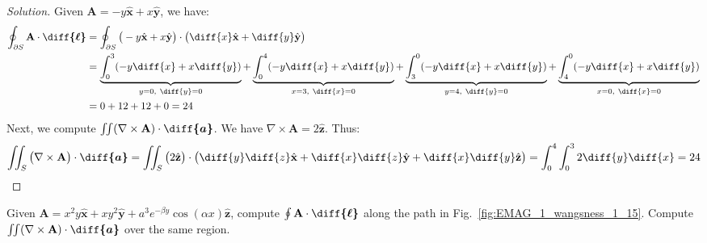 \documentclass[crop=false,class=book,oneside]{standalone}
\begin{document}
            \begin{proof}[Solution]
                Given
                $\mathbf{A}=-y\hat{\mathbf{x}}+x\hat{\mathbf{y}}$,
                we have:
                \begin{align*}
                    \oint_{\partial S}
                    \mathbf{A}\cdot\boldsymbol{\diff{\ell}}
                    &=\oint_{\partial{S}}\big(-y\hat{\mathbf{x}}
                    +x\hat{\mathbf{y}}\big)
                    \cdot\big(\diff{x}\hat{\mathbf{x}}
                    +\diff{y}\hat{\mathbf{y}}\big)\\
                    &=\underbrace{%
                        \int_{0}^{3}(-y\diff{x}+x\diff{y})
                    }_{y=0,\ \diff{y}=0}
                    +\underbrace{%
                        \int_{0}^{4}(-y\diff{x}+x\diff{y})
                    }_{x=3,\ \diff{x}=0}
                    +\underbrace{%
                        \int_{3}^{0}(-y\diff{x}+x\diff{y})
                    }_{y=4,\ \diff{y}=0}
                    +\underbrace{%
                        \int_{4}^{0}(-y\diff{x}+x\diff{y})
                    }_{x=0,\ \diff{x}=0}\\
                    &=0+12+12+0=24
                \end{align*}
                Next, we compute
                $\iint(\nabla\times\mathbf{A})%
                 \cdot\boldsymbol{\diff{a}}$.
                We have
                $\nabla\times\mathbf{A}=%
                 2\hat{\mathbf{z}}$.
                Thus:
                \begin{equation*}
                    \iint_{S}\big(\nabla\times\mathbf{A}\big)
                    \cdot\boldsymbol{\diff{a}}
                    =\iint_{S}\big(2\hat{\mathbf{z}}\big)
                    \cdot\big(\diff{y}\diff{z}\hat{\mathbf{x}}
                    +\diff{x}\diff{z}\hat{\mathbf{y}}
                    +\diff{x}\diff{y}\hat{\mathbf{z}}\big)
                    =\int_{0}^{4}\int_{0}^{3}2\diff{y}\diff{x}
                    =24
                \end{equation*}
            \end{proof}
            \begin{problem}[Wangsness 1-15]
                \label{problem:EMAG_1_wangsness_1_15}
                Given
                $\mathbf{A}%
                 =x^{2}y\hat{\mathbf{x}}%
                 +xy^{2}\hat{\mathbf{y}}%
                 +a^{3}e^{-\beta{y}}\cos(\alpha{x})\hat{\mathbf{z}}$,
                compute
                $\oint\mathbf{A}\cdot\boldsymbol{\diff{\ell}}$
                along the path in Fig.~\ref{fig:EMAG_1_wangsness_1_15}.
                Compute
                $\iint(\nabla\times\mathbf{A})%
                 \cdot\boldsymbol{\diff{a}}$
                over the same region.
            \end{problem}
\end{document}
